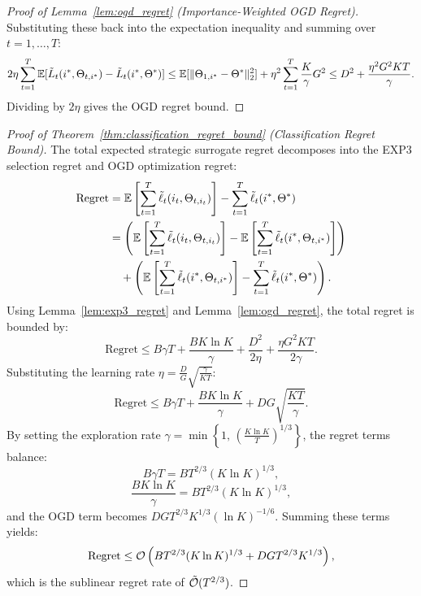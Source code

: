 \begin{proof}[Proof of Lemma~\ref{lem:ogd_regret} (Importance-Weighted OGD Regret)]
Substituting these back into the expectation inequality and summing over $t = 1, \dots, T$:
\begin{equation}
    2\eta \sum_{t=1}^T \mathbb{E}[\tilde{L}_t(i^*, \Theta_{t, i^*}) - \tilde{L}_t(i^*, \Theta^*)] \le \mathbb{E}[\|\Theta_{1, i^*} - \Theta^*\|_2^2] + \eta^2 \sum_{t=1}^T \frac{K}{\gamma} G^2 \le D^2 + \frac{\eta^2 G^2 K T}{\gamma}.
\end{equation}
Dividing by $2\eta$ gives the OGD regret bound.
\end{proof}

\label{app:proof_classification_regret_bound}
\begin{proof}[Proof of Theorem~\ref{thm:classification_regret_bound} (Classification Regret Bound)]
The total expected strategic surrogate regret decomposes into the EXP3 selection regret and OGD optimization regret:
\begin{align}
    \text{Regret} &= \mathbb{E}\left[ \sum_{t=1}^T \tilde{\ell}_t(i_t, \Theta_{t, i_t}) \right] - \sum_{t=1}^T \tilde{\ell}_t(i^*, \Theta^*) \nonumber \\
    &= \left( \mathbb{E}\left[ \sum_{t=1}^T \tilde{\ell}_t(i_t, \Theta_{t, i_t}) \right] - \mathbb{E}\left[ \sum_{t=1}^T \tilde{\ell}_t(i^*, \Theta_{t, i^*}) \right] \right) \nonumber \\
    &\quad + \left( \mathbb{E}\left[ \sum_{t=1}^T \tilde{\ell}_t(i^*, \Theta_{t, i^*}) \right] - \sum_{t=1}^T \tilde{\ell}_t(i^*, \Theta^*) \right).
\end{align}
Using Lemma~\ref{lem:exp3_regret} and Lemma~\ref{lem:ogd_regret}, the total regret is bounded by:
\begin{equation}
    \text{Regret} \le B \gamma T + \frac{B K \ln K}{\gamma} + \frac{D^2}{2\eta} + \frac{\eta G^2 K T}{2 \gamma}.
\end{equation}
Substituting the learning rate $\eta = \frac{D}{G}\sqrt{\frac{\gamma}{K T}}$:
\begin{equation}
    \text{Regret} \le B \gamma T + \frac{B K \ln K}{\gamma} + D G \sqrt{\frac{K T}{\gamma}}.
\end{equation}
By setting the exploration rate $\gamma = \min\left\{ 1, \, \left( \frac{K \ln K}{T} \right)^{1/3} \right\}$, the regret terms balance:
\begin{equation}
    B \gamma T = B T^{2/3}(K \ln K)^{1/3},
\end{equation}
\begin{equation}
    \frac{B K \ln K}{\gamma} = B T^{2/3}(K \ln K)^{1/3},
\end{equation}
and the OGD term becomes $D G T^{2/3} K^{1/3} (\ln K)^{-1/6}$. Summing these terms yields:
\begin{equation}
    \text{Regret} \le \mathcal{O}\left( B T^{2/3} (K \ln K)^{1/3} + D G T^{2/3} K^{1/3} \right),
\end{equation}
which is the sublinear regret rate of $\tilde{\mathcal{O}}(T^{2/3})$.
\end{proof}
